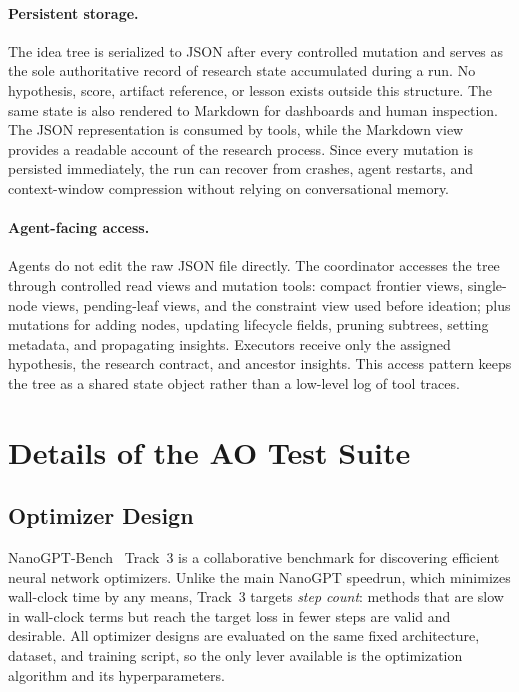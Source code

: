 \documentclass{llmxive}
\begin{document}
\paragraph{Persistent storage.}
The idea tree is serialized to JSON after every controlled mutation and serves
as the sole authoritative record of research state accumulated during a run.
No hypothesis, score, artifact reference, or lesson exists outside this
structure. The same state is also rendered to Markdown for dashboards and human
inspection. The JSON representation is consumed by tools, while the Markdown
view provides a readable account of the research process. Since every mutation
is persisted immediately, the run can recover from crashes, agent restarts, and
context-window compression without relying on conversational memory.

\paragraph{Agent-facing access.}
Agents do not edit the raw JSON file directly. The coordinator accesses the
tree through controlled read views and mutation tools: compact frontier views,
single-node views, pending-leaf views, and the constraint view used before
ideation; plus mutations for adding nodes, updating lifecycle fields, pruning
subtrees, setting metadata, and propagating insights. Executors receive only the
assigned hypothesis, the research contract, and ancestor insights. This access
pattern keeps the tree as a shared state object rather than a low-level log of
tool traces.

\FloatBarrier

\section{Details of the AO Test Suite}
\label{app:ao-suite-details}
\label{app:benchmark-details}

\subsection{Optimizer Design}
\label{app:benchmark-optimizer-design}

NanoGPT-Bench~\citep{nanogptbench} Track~3 is a collaborative benchmark
for discovering efficient neural network optimizers.
Unlike the main NanoGPT speedrun, which minimizes wall-clock time by any
means, Track~3 targets \emph{step count}: methods that are slow in
wall-clock terms but reach the target loss in fewer steps are valid and
desirable.
All optimizer designs are evaluated on the same fixed architecture, dataset,
and training script, so the only lever available is the optimization
algorithm and its hyperparameters.
\end{document}
